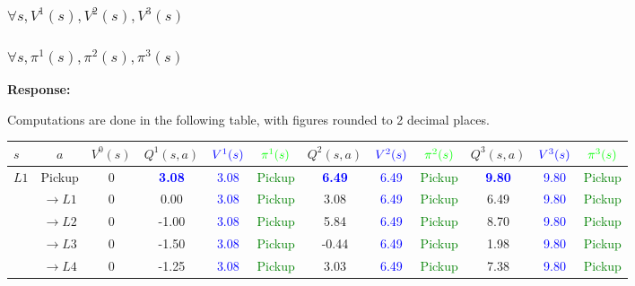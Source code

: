 \documentclass[12pt, letterpaper]{article}
\begin{document}
\subsubsection{$\forall s,V^1(s),V^2(s),V^3(s)$}
\subsubsection{$\forall s,\pi^1(s),\pi^2(s),\pi^3(s)$}

\textbf{Response:}

Computations are done in the following table, with figures rounded to 2 decimal places.

\begin{footnotesize}
    \begin{tabular}{|l|c|c|c|c|c|c|c|c|c|c|c|}        
    \hline
    $s$ & $a$  & $V^0(s)$ & $Q^1(s,a)$ & $\textcolor{blue}{V^1(s)}$ & $\textcolor{green}{\pi^1(s)}$ & $Q^2(s,a)$ & $\textcolor{blue}{V^2(s)}$ & $\textcolor{green}{\pi^2(s)}$ & $Q^3(s,a)$ & $\textcolor{blue}{V^3(s)}$ & $\textcolor{green}{\pi^3(s)}$ \\ \hline
    \multirow{5}{*}{$L1$}   & Pickup            & 0 & \textbf{\textcolor{blue}{3.08}}      & \textcolor{blue}{3.08} & \textcolor{green}{Pickup} & \textbf{\textcolor{blue}{6.49}} & \textcolor{blue}{6.49}  & \textcolor{green}{Pickup} & \textbf{\textcolor{blue}{9.80}} & \textcolor{blue}{9.80}  &\textcolor{green}{Pickup} \\ \cline{2-12}
                            & $\rightarrow L1$  & 0 & 0.00      & \textcolor{blue}{3.08} & \textcolor{green}{Pickup} & 3.08 & \textcolor{blue}{6.49}  & \textcolor{green}{Pickup}  & 6.49 & \textcolor{blue}{9.80} & \textcolor{green}{Pickup}   \\ \cline{2-12}
                            & $\rightarrow L2$  & 0 & -1.00     & \textcolor{blue}{3.08} & \textcolor{green}{Pickup} & 5.84 & \textcolor{blue}{6.49}  & \textcolor{green}{Pickup} & 8.70 & \textcolor{blue}{9.80} & \textcolor{green}{Pickup}  \\ \cline{2-12}
                            & $\rightarrow L3$  & 0 & -1.50     & \textcolor{blue}{3.08} & \textcolor{green}{Pickup} & -0.44 & \textcolor{blue}{6.49}  & \textcolor{green}{Pickup} & 1.98 & \textcolor{blue}{9.80} & \textcolor{green}{Pickup}   \\ \cline{2-12}
                            & $\rightarrow L4$  & 0 & -1.25     & \textcolor{blue}{3.08} & \textcolor{green}{Pickup} & 3.03 & \textcolor{blue}{6.49}  & \textcolor{green}{Pickup} & 7.38 & \textcolor{blue}{9.80} & \textcolor{green}{Pickup} \\ \cline{2-12}

\end{tabular}
\end{footnotesize}
\end{document}
